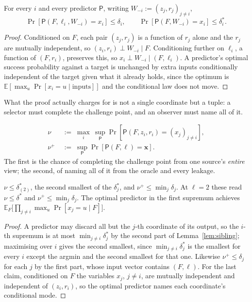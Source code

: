 \documentclass{conjura-conjecture}
\newcommand{\Prob}[1]{\Pr\!\left[#1\right]}
\newcommand{\Exp}{\mathbb{E}}
\newcommand{\vx}{\mathbf{x}}
\newcommand{\vl}{\boldsymbol{\ell}}
\begin{document}
\begin{lemma}\label{lem:sibling}
For every $i$ and every predictor $\mathsf{P}$, writing
$W_{-i} := (z_j,r_j)_{j \ne i}$,
\[
  \Prob{\mathsf{P}(F,\ell_i,W_{-i}) = x_i} \le \delta_i ,
  \qquad
  \Prob{\mathsf{P}(F,W_{-i}) = x_i} \le \delta^{\ast}_i .
\]
\end{lemma}

\begin{proof}
Conditioned on $F$, each pair $(z_j,r_j)$ is a function of $r_j$ alone and
the $r_j$ are mutually independent, so $(z_i,r_i) \perp W_{-i} \mid F$.
Conditioning further on $\ell_i$, a function of $(F,r_i)$, preserves this,
so $x_i \perp W_{-i} \mid (F,\ell_i)$. A predictor's optimal success
probability against a target is unchanged by extra inputs conditionally
independent of the target given what it already holds, since the optimum
is $\Exp[\max_u \Prob{x_i = u \mid \text{inputs}}]$ and the conditional
law does not move.
\end{proof}

What the proof actually charges for is not a single coordinate but a
tuple: a selector must complete the challenge point, and an observer must
name all of it.

\begin{definition}\label{def:nu}
\begin{align*}
  \nu &\;:=\; \max_{i}\ \sup_{\mathsf{P}}
  \Prob{\mathsf{P}(F,z_i,r_i) = (x_j)_{j \ne i}} , \\
  \nu^{+} &\;:=\; \sup_{\mathsf{P}} \Prob{\mathsf{P}(F,\vl) = \vx} .
\end{align*}
The first is the chance of completing the challenge point from one
source's \emph{entire} view; the second, of naming all of it from the
oracle and every leakage.
\end{definition}

\begin{lemma}\label{lem:nu}
$\nu \le \delta^{\ast}_{(2)}$, the second smallest of the
$\delta^{\ast}_j$, and $\nu^{+} \le \min_j \delta_j$. At $\ell = 2$ these
read $\nu \le \delta^{\ast}$ and $\nu^{+} \le \min_j \delta_j$. The
optimal predictor in the first supremum achieves
$\Exp_F\bigl[\prod_{j \ne i}\max_u \Prob{x_j = u \mid F}\bigr]$.
\end{lemma}

\begin{proof}
A predictor may discard all but the $j$-th coordinate of its output, so
the $i$-th supremum is at most $\min_{j \ne i}\delta^{\ast}_j$ by the
second part of Lemma~\ref{lem:sibling}; maximising over $i$ gives the
second smallest, since $\min_{j \ne i}\delta^{\ast}_j$ is the smallest for
every $i$ except the argmin and the second smallest for that one.
Likewise $\nu^{+} \le \delta_j$ for each $j$ by the first part, whose
input vector contains $(F,\vl)$. For the last claim, conditioned on $F$
the variables $x_j$, $j \ne i$, are mutually independent and independent
of $(z_i,r_i)$, so the optimal predictor names each coordinate's
conditional mode.
\end{proof}
\end{document}
